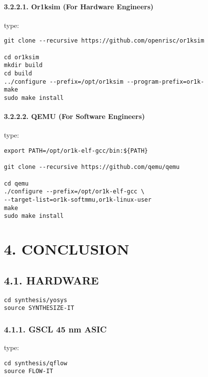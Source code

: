 \documentclass[]{article}
\let\oldparagraph\paragraph
\renewcommand{\paragraph}[1]{\oldparagraph{#1}\mbox{}}
\begin{document}
\paragraph{3.2.2.1. Or1ksim (For Hardware
Engineers)}\label{or1ksim-for-hardware-engineers}

type:

\begin{verbatim}
git clone --recursive https://github.com/openrisc/or1ksim

cd or1ksim
mkdir build
cd build
../configure --prefix=/opt/or1ksim --program-prefix=or1k-
make
sudo make install
\end{verbatim}

\paragraph{3.2.2.2. QEMU (For Software
Engineers)}\label{qemu-for-software-engineers}

type:

\begin{verbatim}
export PATH=/opt/or1k-elf-gcc/bin:${PATH}

git clone --recursive https://github.com/qemu/qemu

cd qemu
./configure --prefix=/opt/or1k-elf-gcc \
--target-list=or1k-softmmu,or1k-linux-user
make
sudo make install
\end{verbatim}

\section{4. CONCLUSION}\label{conclusion}

\subsection{4.1. HARDWARE}\label{hardware-1}

\begin{verbatim}
cd synthesis/yosys
source SYNTHESIZE-IT
\end{verbatim}

\subsubsection{4.1.1. GSCL 45 nm ASIC}\label{gscl-45-nm-asic}

type:

\begin{verbatim}
cd synthesis/qflow
source FLOW-IT
\end{verbatim}
\end{document}
